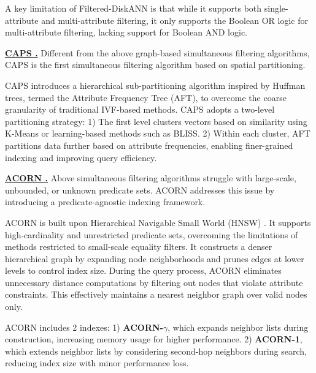 \documentclass[sigconf, nonacm]{acmart}
\begin{document}
	A key limitation of Filtered-DiskANN is that while it supports both single-attribute and multi-attribute filtering, it only supports the Boolean OR logic for multi-attribute filtering, lacking support for Boolean AND logic.
	
	
	\noindent\textbf{\underline{CAPS \cite{CAPS}.}} Different from the above graph-based simultaneous filtering algorithms, CAPS is the first simultaneous filtering algorithm based on spatial partitioning.
	
	CAPS introduces a hierarchical sub-partitioning algorithm inspired by Huffman trees, termed the Attribute Frequency Tree (AFT), to overcome the coarse granularity of traditional IVF-based methods. CAPS adopts a two-level partitioning strategy:  
	1) The first level clusters vectors based on similarity using K-Means or learning-based methods such as BLISS. 2) Within each cluster, AFT partitions data further based on attribute frequencies, enabling finer-grained indexing and improving query efficiency.
	
	
	\noindent\textbf{\underline{ACORN \cite{ACORN}.}}  
	Above simultaneous filtering algorithms struggle with large-scale, unbounded, or unknown predicate sets.
	ACORN addresses this issue by introducing a predicate-agnostic indexing framework.
	
	ACORN is built upon Hierarchical Navigable Small World (HNSW) \cite{hnsw}. It supports high-cardinality and unrestricted predicate sets, overcoming the limitations of methods restricted to small-scale equality filters. It constructs a denser hierarchical graph by expanding node neighborhoods and prunes edges at lower levels to control index size. During the query process, ACORN eliminates unnecessary distance computations by filtering out nodes that violate attribute constraints. This effectively maintains a nearest neighbor graph over valid nodes only. 
	
	ACORN includes 2 indexes:  
	1) \textbf{ACORN-$\gamma$}, which expands neighbor lists during construction, increasing memory usage for higher performance.  
	2) \textbf{ACORN-1}, which extends neighbor lists by considering second-hop neighbors during search, reducing index size with minor performance loss.
	
\end{document}
